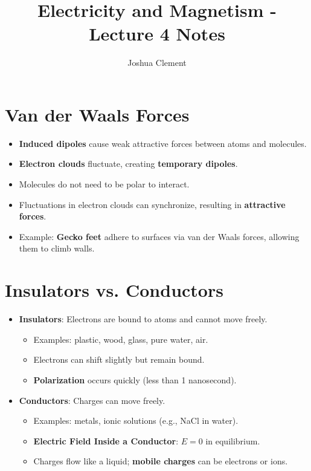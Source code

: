 \documentclass{article}
\begin{document}
\title{Electricity and Magnetism - Lecture 4 Notes}
\author{Joshua Clement}
\maketitle

\section*{Van der Waals Forces}
\begin{itemize}
    \item \textbf{Induced dipoles} cause weak attractive forces between atoms and molecules.
    \item \textbf{Electron clouds} fluctuate, creating \textbf{temporary dipoles}.
    \item Molecules do not need to be polar to interact.
    \item Fluctuations in electron clouds can synchronize, resulting in \textbf{attractive forces}.
    \item Example: \textbf{Gecko feet} adhere to surfaces via van der Waals forces, allowing them to climb walls.
\end{itemize}

\section*{Insulators vs. Conductors}
\begin{itemize}
    \item \textbf{Insulators}: Electrons are bound to atoms and cannot move freely.
    \begin{itemize}
        \item Examples: plastic, wood, glass, pure water, air.
        \item Electrons can shift slightly but remain bound.
        \item \textbf{Polarization} occurs quickly (less than 1 nanosecond).
    \end{itemize}
    \item \textbf{Conductors}: Charges can move freely.
    \begin{itemize}
        \item Examples: metals, ionic solutions (e.g., NaCl in water).
        \item \textbf{Electric Field Inside a Conductor}: \(E = 0\) in equilibrium.
        \item Charges flow like a liquid; \textbf{mobile charges} can be electrons or ions.
    \end{itemize}
\end{itemize}
\end{document}
